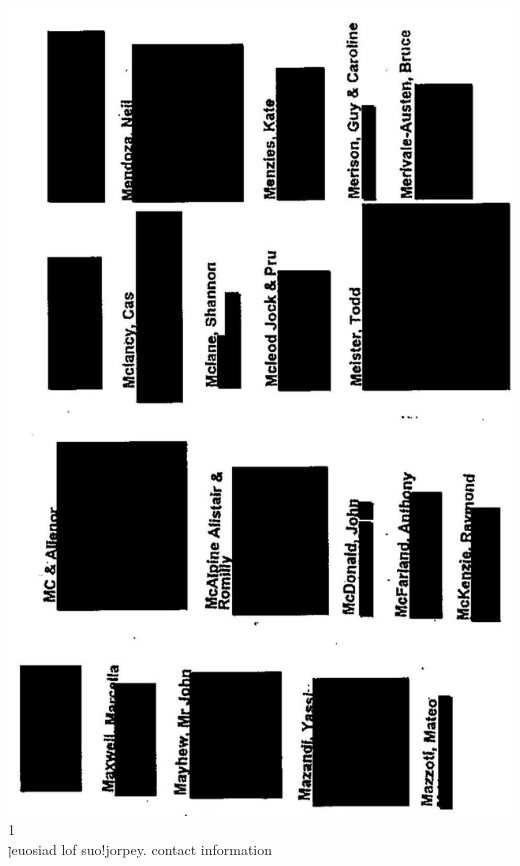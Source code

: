 \documentclass[10pt]{article}
\begin{document}
\includegraphics[max width=\textwidth, center]{2025_02_27_dd68c3d38de88f0516d9g-159(3)}\\
1\\
ןeuosiad lof suo!jorpey. contact information\\
\end{document}
